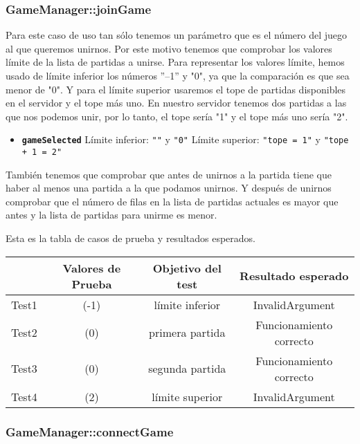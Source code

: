 \subsubsection{GameManager::joinGame}

Para este caso de uso tan sólo tenemos un parámetro que es el número del juego al que queremos unirnos. Por este motivo tenemos que comprobar los valores límite de la lista de partidas a unirse. Para representar los valores límite, hemos usado de límite inferior los números ''--1'' y "0", ya que la comparación es que sea menor de "0". Y para el límite superior usaremos el tope de partidas disponibles en el servidor y el tope más uno. En nuestro servidor tenemos dos partidas a las que nos podemos unir, por lo tanto, el tope sería "1" y el tope más uno sería "2". 

\begin{itemize}
\item \textbf{\texttt{gameSelected}}
\subitem Límite inferior: \texttt{""} y \texttt{"0"}
\subitem Límite superior: \texttt{"tope = 1"} y \texttt{"tope + 1 = 2"}
\end{itemize}

También tenemos que comprobar que antes de unirnos a la partida tiene que haber al menos una partida a la que podamos unirnos. Y después de unirnos comprobar que el número de filas en la lista de partidas actuales es mayor que antes y la lista de partidas para unirme es menor.

Esta es la tabla de casos de prueba y resultados esperados.

{\footnotesize
\begin{longtable}[c]{lccc}
 & \textbf{Valores de Prueba} & \textbf{Objetivo del test} & \textbf{Resultado esperado} \\
\hline \hline
\endhead

Test1 & (-1) & límite inferior & InvalidArgument\\
Test2 & (0) & primera partida & Funcionamiento correcto\\
Test3 & (0) & segunda partida & Funcionamiento correcto\\
Test4 & (2) & límite superior & InvalidArgument\\

\hline
\end{longtable}
}

\subsubsection{GameManager::connectGame}

